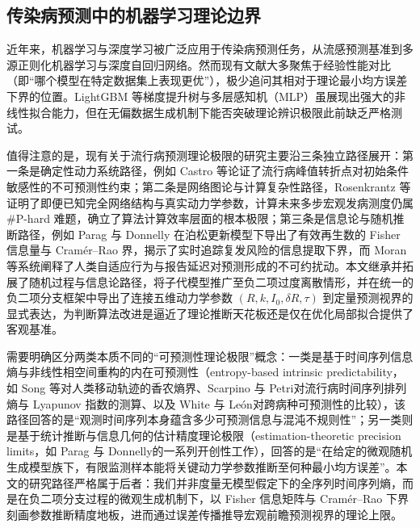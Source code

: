 \documentclass[11pt,a4paper]{article}
\theoremstyle{plain}
\theoremstyle{definition}
\begin{document}
\subsection{传染病预测中的机器学习理论边界}
近年来，机器学习与深度学习被广泛应用于传染病预测任务，从流感预测基准\citep{reich2019collaborative, ray2023comparing}到多源正则化机器学习\citep{colubri2019machine}与深度自回归网络\citep{salinas2020deepar}。然而现有文献大多聚焦于经验性能对比（即“哪个模型在特定数据集上表现更优”），极少追问其相对于理论最小均方误差下界的位置。LightGBM 等梯度提升树\citep{ke2017lightgbm}与多层感知机（MLP）虽展现出强大的非线性拟合能力，但在无偏数据生成机制下能否突破理论辨识极限此前缺乏严格测试。

值得注意的是，现有关于流行病预测理论极限的研究主要沿三条独立路径展开：第一条是确定性动力系统路径，例如 Castro 等\citep{castro2020predictability}论证了流行病峰值转折点对初始条件敏感性的不可预测性约束；第二条是网络图论与计算复杂性路径，Rosenkrantz 等\citep{rosenkrantz2022fundamental}证明了即便已知完全网络结构与真实动力学参数，计算未来多步宏观发病测度仍属 \#P-hard 难题，确立了算法计算效率层面的根本极限；第三条是信息论与随机推断路径，例如 Parag 与 Donnelly\citep{parag2022fundamental} 在泊松更新模型下导出了有效再生数的 Fisher 信息量与 Cram\'er--Rao 界，揭示了实时追踪复发风险的信息提取下界，而 Moran 等\citep{moran2016epidemic}系统阐释了人类自适应行为与报告延迟对预测形成的不可约扰动。本文继承并拓展了随机过程与信息论路径，将子代模型推广至负二项过度离散情形，并在统一的负二项分支框架中导出了连接五维动力学参数 $(R, k, I_0, \delta R, \tau)$ 到定量预测视界的显式表达，为判断算法改进是逼近了理论推断天花板还是仅在优化局部拟合提供了客观基准。

需要明确区分两类本质不同的“可预测性理论极限”概念：一类是基于时间序列信息熵与非线性相空间重构的内在可预测性（entropy-based intrinsic predictability，如 Song 等\citep{song2010limits}对人类移动轨迹的香农熵界、Scarpino 与 Petri\citep{scarpino2019predictability}对流行病时间序列排列熵与 Lyapunov 指数的测算、以及 White 与 Le{\'o}n\citep{white2026forecastability}对跨病种可预测性的比较），该路径回答的是“观测时间序列本身蕴含多少可预测信息与混沌不规则性”；另一类则是基于统计推断与信息几何的估计精度理论极限（estimation-theoretic precision limits，如 Parag 与 Donnelly\citep{parag2022fundamental, parag2022quantifying}的一系列开创性工作），回答的是“在给定的微观随机生成模型族下，有限监测样本能将关键动力学参数推断至何种最小均方误差”。本文的研究路径严格属于后者：我们并非度量无模型假定下的全序列时间序列熵，而是在负二项分支过程的微观生成机制下，以 Fisher 信息矩阵与 Cram\'er--Rao 下界刻画参数推断精度地板，进而通过误差传播推导宏观前瞻预测视界的理论上限。
\end{document}
